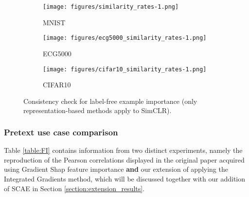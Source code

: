 \begin{figure}[H]
\centering
\begin{subfigure}{0.32\textwidth}
    \texttt{[image: figures/similarity\_rates-1.png]}
    \caption{MNIST}
    \label{fig:MNIST_ex_consistency}
\end{subfigure}
\hfill
\begin{subfigure}{0.32\textwidth}
    \texttt{[image: figures/ecg5000\_similarity\_rates-1.png]}
    \caption{ECG5000}
    \label{fig:ECG5000_ex_consistency}
\end{subfigure}
\hfill
\begin{subfigure}{0.32\textwidth}
    \texttt{[image: figures/cifar10\_similarity\_rates-1.png]}
    \caption{CIFAR10}
    \label{fig:cifar_ex_consistency}
\end{subfigure}
        
\caption{Consistency check for label-free example importance (only representation-based methods apply to SimCLR).}
\label{fig:ex_figures}
\end{figure}

\subsubsection{Pretext use case comparison} 

Table \ref{table:FI} contains information from two distinct experiments, namely the reproduction of the Pearson correlations displayed in the original paper acquired using Gradient Shap feature importance \textbf{and} our extension of applying the Integrated Gradients method, which will be discussed together with our addition of SCAE in Section \ref{section:extension_results}.

